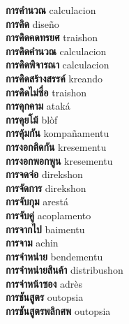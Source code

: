 \textbf{ การคำนวณ  } calculacion \\
\textbf{ การคิด  } diseño \\
\textbf{ การคิดคดทรยศ  } traishon \\
\textbf{ การคิดคำนวณ  } calculacion \\
\textbf{ การคิดพิจารณา  } calculacion \\
\textbf{ การคิดสร้างสรรค์  } kreando \\
\textbf{ การคิดไม่ซื่อ  } traishon \\
\textbf{ การคุกคาม  } ataká \\
\textbf{ การคุยโม้  } blòf \\
\textbf{ การคุ้มกัน  } kompañamentu \\
\textbf{ การงอกติดกัน  } kresementu \\
\textbf{ การงอกพอกพูน  } kresementu \\
\textbf{ การจดจ่อ  } direkshon \\
\textbf{ การจัดการ  } direkshon \\
\textbf{ การจับกุม  } arestá \\
\textbf{ การจับคู่  } acoplamento \\
\textbf{ การจากไป  } baimentu \\
\textbf{ การจาม  } achin \\
\textbf{ การจำหน่าย  } bendementu \\
\textbf{ การจำหน่ายสินค้า  } distribushon \\
\textbf{ การจ่าหน้าซอง  } adrès \\
\textbf{ การชันสูตร  } outopsia \\
\textbf{ การชันสูตรพลิกศพ  } outopsia \\
